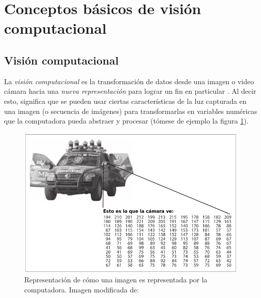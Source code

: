 

	\section{Conceptos básicos de visión computacional}
		\subsection*{Visión computacional}
	La \textit{visión computacional} es la transformación de datos desde una imagen o video cámara hacia una \textit{nueva representación} para lograr un fin en particular \cite{bradski2008learning}. Al decir esto, significa que se pueden usar ciertas características de la luz capturada en una imagen (o secuencia de imágenes) para transformarlas en variables numéricas que la computadora pueda abstraer y procesar (tómese de ejemplo la figura \ref{fig:camera_representation}).

\begin{figure}
\centering
\includegraphics[scale=0.6]{images/new_representation_image.png}
\caption{Representación de cómo una imagen es representada por la computadora. Imagen modificada de:}
\label{fig:camera_representation}
\end{figure}

